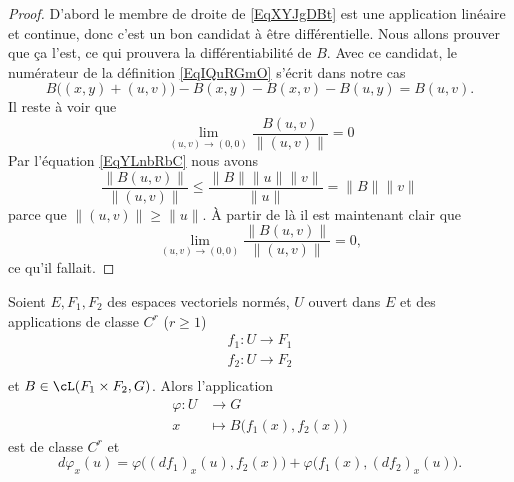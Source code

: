 \begin{proof}
    D'abord le membre de droite de \eqref{EqXYJgDBt} est une application linéaire et continue, donc c'est un bon candidat à être différentielle. Nous allons prouver que ça l'est, ce qui prouvera la différentiabilité de \( B\). Avec ce candidat, le numérateur de la définition \eqref{EqIQuRGmO} s'écrit dans notre cas
    \begin{equation}
        B\big( (x,y)+(u,v) \big)-B(x,y)-B(x,v)-B(u,y)=B(u,v).
    \end{equation}
    Il reste à voir que 
    \begin{equation}
        \lim_{ (u,v)\to (0,0) } \frac{ B(u,v) }{ \| (u,v) \| }=0
    \end{equation}
    Par l'équation \eqref{EqYLnbRbC} nous avons
    \begin{equation}
        \frac{ \| B(u,v) \| }{ \| (u,v) \| }\leq \frac{ \| B \|\| u \|\| v \| }{ \| u \| }=\| B \|\| v \|
    \end{equation}
    parce que \( \| (u,v) \|\geq \| u \|\). À partir de là il est maintenant clair que
    \begin{equation}
        \lim_{(u,v)\to (0,0)}\frac{ \| B(u,v) \| }{ \| (u,v) \| }=0,
    \end{equation}
    ce qu'il fallait.
\end{proof}

\begin{proposition}
    Soient \( E,F_1,F_2\) des espaces vectoriels normés, \( U\) ouvert dans \( E\) et des applications de classe \( C^r\) (\( r\geq 1\))
    \begin{subequations}
        \begin{align}
            f_1\colon U\to F_1\\
            f_2\colon U\to F_2\\
        \end{align}
    \end{subequations}
    et \( B\in\cL(F_1\times F_2,G)\). Alors l'application
    \begin{equation}
        \begin{aligned}
            \varphi\colon U&\to G \\
            x&\mapsto B\big( f_1(x),f_2(x) \big) 
        \end{aligned}
    \end{equation}
    est de classe \( C^r\) et
    \begin{equation}    \label{EqMNGBXWc}
        d\varphi_x(u)=\varphi\big( (df_1)_x(u),f_2(x) \big)+\varphi\big( f_1(x),(df_2)_x(u) \big).
    \end{equation}
\end{proposition}

